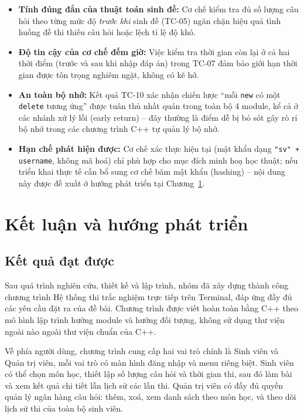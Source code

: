 \documentclass[11pt]{report}
\begin{document}
\begin{itemize}[leftmargin=*]
    \item \textbf{Tính đúng đắn của thuật toán sinh đề:} Cơ chế kiểm tra đủ số lượng câu hỏi theo từng mức độ \textit{trước khi} sinh đề (TC-05) ngăn chặn hiệu quả tình huống đề thi thiếu câu hỏi hoặc lệch tỉ lệ độ khó.
    \item \textbf{Độ tin cậy của cơ chế đếm giờ:} Việc kiểm tra thời gian còn lại ở cả hai thời điểm (trước và sau khi nhập đáp án) trong TC-07 đảm bảo giới hạn thời gian được tôn trọng nghiêm ngặt, không có kẽ hở.
    \item \textbf{An toàn bộ nhớ:} Kết quả TC-10 xác nhận chiến lược ``mỗi \texttt{new} có một \texttt{delete} tương ứng'' được tuân thủ nhất quán trong toàn bộ 4 module, kể cả ở các nhánh xử lý lỗi (early return) -- đây thường là điểm dễ bị bỏ sót gây rò rỉ bộ nhớ trong các chương trình C++ tự quản lý bộ nhớ.
    \item \textbf{Hạn chế phát hiện được:} Cơ chế xác thực hiện tại (mật khẩu dạng \texttt{"sv" + username}, không mã hoá) chỉ phù hợp cho mục đích minh hoạ học thuật; nếu triển khai thực tế cần bổ sung cơ chế băm mật khẩu (hashing) -- nội dung này được đề xuất ở hướng phát triển tại Chương~\ref{ketluan}.
\end{itemize}

\chapter{Kết luận và hướng phát triển}
\label{ketluan}

\section{Kết quả đạt được}

Sau quá trình nghiên cứu, thiết kế và lập trình, nhóm đã xây dựng thành công chương trình Hệ thống thi trắc nghiệm trực tiếp trên Terminal, đáp ứng đầy đủ các yêu cầu đặt ra của đề bài. Chương trình được viết hoàn toàn bằng C++ theo mô hình lập trình hướng module và hướng đối tượng, không sử dụng thư viện ngoài nào ngoài thư viện chuẩn của C++.

Về phía người dùng, chương trình cung cấp hai vai trò chính là Sinh viên và Quản trị viên, mỗi vai trò có màn hình đăng nhập và menu riêng biệt. Sinh viên có thể chọn môn học, thiết lập số lượng câu hỏi và thời gian thi, sau đó làm bài và xem kết quả chi tiết lẫn lịch sử các lần thi. Quản trị viên có đầy đủ quyền quản lý ngân hàng câu hỏi: thêm, xoá, xem danh sách theo môn học, và theo dõi lịch sử thi của toàn bộ sinh viên.
\end{document}
